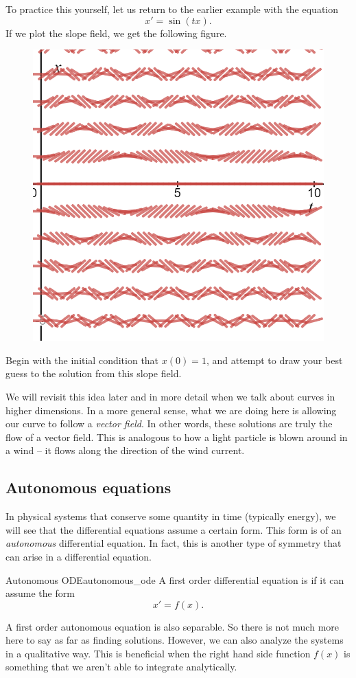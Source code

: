             To practice this yourself, let us return to the earlier example with the equation
            \[
            x'=\sin(tx).
            \]
            If we plot the slope field, we get the following figure.
            \begin{figure}[H]
                \centering
                \includegraphics[width=.6\textwidth]{Figures_Part_1/slope_field_nonlinear.png}
            \end{figure}
            Begin with the initial condition that $x(0)=1$, and attempt to draw your best guess to the solution from this slope field.
            
            We will revisit this idea later and in more detail when we talk about curves in higher dimensions.  In a more general sense, what we are doing here is allowing our curve to follow a \emph{vector field}.  In other words, these solutions are truly the flow of a vector field.  This is analogous to how a light particle is blown around in a wind -- it flows along the direction of the wind current.
            
          
            
            \subsection{Autonomous equations}
                
                In physical systems that conserve some quantity in time (typically energy), we will see that the differential equations assume a certain form.  This form is of an \emph{autonomous} differential equation. In fact, this is another type of symmetry that can arise in a differential equation.
                
                \begin{df}{Autonomous ODE}{autonomous_ode}
                    A first order differential equation is  if it can assume the form
                    \[
                    x'=f(x).
                    \]
                \end{df}
                \noindent A first order autonomous equation is also separable. So there is not much more here to say as far as finding solutions. However, we can also analyze the systems in a qualitative way.  This is beneficial when the right hand side function $f(x)$ is something that we aren't able to integrate analytically.
                
